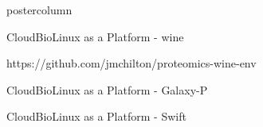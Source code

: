 \documentclass[final]{beamer}
\begin{document}
\begin{frame}
\begin{columns}
\begin{column}{.5\textwidth}
\begin{beamercolorbox}[center,wd=\textwidth]{postercolumn}
\begin{minipage}[T]{.95\textwidth}
{            \vfill
            
            \begin{block}{CloudBioLinux as a Platform - wine}

            https://github.com/jmchilton/proteomics-wine-env

            \end{block}
            
            \vfill
            
            \begin{block}{CloudBioLinux as a Platform - Galaxy-P}

            \end{block}
            
            \vfill
            
            \begin{block}{CloudBioLinux as a Platform - Swift}

            \end{block}
          }
        \end{minipage}
      \end{beamercolorbox}
    \end{column}              

  \end{columns}   
\end{frame}
\end{document}
